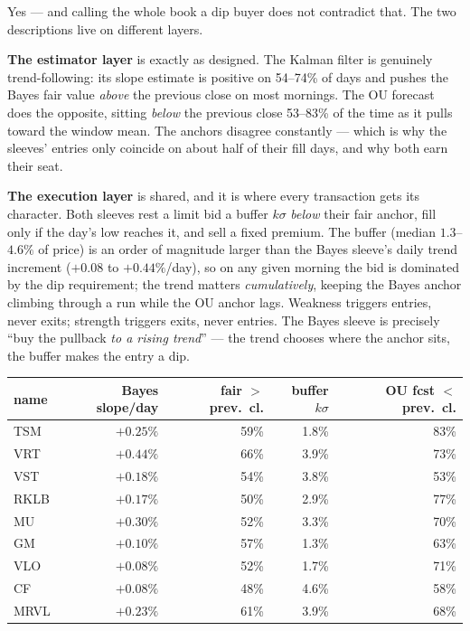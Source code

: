 \documentclass[11pt,a4paper]{article}
\begin{document}
\begin{tcolorbox}[colback=bcnavy!5, colframe=bcnavy, boxrule=0.8pt,
  title={\bfseries But aren't the sleeves a trend follower and a mean-reverter?},
  coltitle=white]
Yes --- and calling the whole book a dip buyer does not contradict that. The two
descriptions live on different layers.

\textbf{The estimator layer} is exactly as designed. The Kalman filter is
genuinely trend-following: its slope estimate is positive on 54--74\% of days
and pushes the Bayes fair value \emph{above} the previous close on most mornings.
The OU forecast does the opposite, sitting \emph{below} the previous close
53--83\% of the time as it pulls toward the window mean. The anchors disagree
constantly --- which is why the sleeves' entries only coincide on about half of
their fill days, and why both earn their seat.

\textbf{The execution layer} is shared, and it is where every transaction gets
its character. Both sleeves rest a limit bid a buffer $k\sigma$ \emph{below}
their fair anchor, fill only if the day's low reaches it, and sell a fixed
premium. The buffer (median $1.3$--$4.6\%$ of price) is an order of magnitude
larger than the Bayes sleeve's daily trend increment ($+0.08$ to $+0.44\%$/day),
so on any given morning the bid is dominated by the dip requirement; the trend
matters \emph{cumulatively}, keeping the Bayes anchor climbing through a run
while the OU anchor lags. Weakness triggers entries, never exits; strength
triggers exits, never entries. The Bayes sleeve is precisely ``buy the pullback
\emph{to a rising trend}'' --- the trend chooses where the anchor sits, the
buffer makes the entry a dip.

\begin{center}
\small
\begin{tabular}{lrrrr}
\toprule
name & Bayes slope/day & fair $>$ prev.\ cl. & buffer $k\sigma$ & OU fcst $<$ prev.\ cl. \\
\midrule
TSM  & $+0.25\%$ & 59\% & 1.8\% & 83\% \\
VRT  & $+0.44\%$ & 66\% & 3.9\% & 73\% \\
VST  & $+0.18\%$ & 54\% & 3.8\% & 53\% \\
RKLB & $+0.17\%$ & 50\% & 2.9\% & 77\% \\
MU   & $+0.30\%$ & 52\% & 3.3\% & 70\% \\
GM   & $+0.10\%$ & 57\% & 1.3\% & 63\% \\
VLO  & $+0.08\%$ & 52\% & 1.7\% & 71\% \\
CF   & $+0.08\%$ & 48\% & 4.6\% & 58\% \\
MRVL & $+0.23\%$ & 61\% & 3.9\% & 68\% \\
\bottomrule
\end{tabular}
\end{center}


\end{tcolorbox}
\end{document}

